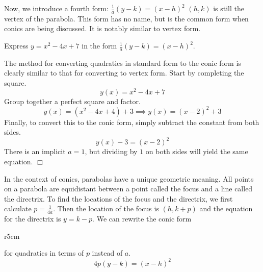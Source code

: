 \documentclass[lang=en,11pt]{elegantbook}
\begin{document}
\noindent Now, we introduce a fourth form: $ \frac{1}{a}(y-k) = (x-h)^2$
$(h,k)$ is still the vertex of the parabola.  This form has no name, but is the common form when conics are being discussed.  It is notably similar to vertex form.

\begin{example}
Express $y = x^2-4x+7$ in the form $\frac{1}{a}(y-k)=(x-h)^2$.
\end{example}
\begin{solution}
The method for converting quadratics in standard form to the conic form is clearly similar to that for converting to vertex form.  Start by completing the square.
$$y(x) = x^2 - 4x + 7 $$
Group together a perfect square and factor.
$$y(x) = (x^2 - 4x + 4) + 3 \implies y(x) = (x-2)^2+3 $$
Finally, to convert this to the conic form, simply subtract the constant from both sides.
$$y(x) - 3 = (x-2)^2 $$
There is an implicit $a=1$, but dividing by $1$ on both sides will yield the same equation. $\Box$
\end{solution}
In the context of conics, parabolas have a unique geometric meaning.  All points on a parabola are equidistant between a point called the focus and a line called the directrix.  To find the locations of the focus and the directrix, we first calculate $p = \frac{1}{4a}$.  Then the location of the focus is $(h,k+p)$ and the equation for the directrix is $y = k-p$.  We can rewrite the conic form 

\begin{wrapfigure}{r}{5cm}
\end{wrapfigure}

\noindent for quadratics in terms of $p$ instead of $a$.
$$4p(y-k) = (x-h)^2 $$
\end{document}
